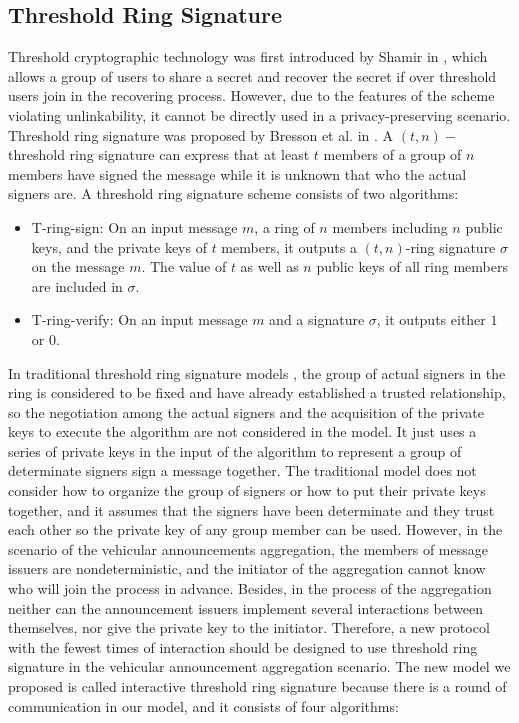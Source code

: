 \documentclass[a4paper]{article}
\begin{document}
\subsection{Threshold Ring Signature}
Threshold cryptographic technology was first introduced by Shamir in \cite{Sha79}, which allows a group of users to share a secret and recover the secret if over threshold users join in the recovering process. However, due to the features of the scheme violating unlinkability, it cannot be directly used in a privacy-preserving scenario. Threshold ring signature was proposed by Bresson et al. in \cite{BSS02}. A $(t,n)-$threshold ring signature can express that at least $t$ members of a group of $n$ members have signed the message while it is unknown that who the actual signers are. A threshold ring signature scheme consists of two algorithms:

\begin{itemize}
 \item T-ring-sign: On an input message $m$, a ring of $n$ members including $n$ public keys, and the private keys of $t$ members, it outputs a $(t,n)$-ring signature $\sigma$ on the message $m$. The value of $t$ as well as $n$ public keys of all ring members are included in $\sigma$.
 \item T-ring-verify: On an input message $m$ and a signature $\sigma$, it outputs either $1$ or $0$.
\end{itemize}

In traditional threshold ring signature models \cite{BSS02}\cite{RH13}, the group of actual signers in the ring is considered to be fixed and have already established a trusted relationship, so the negotiation among the actual signers and the acquisition of the private keys to execute the algorithm are not considered in the model. It just uses a series of private keys in the input of the algorithm to represent a group of determinate signers sign a message together. The traditional model does not consider how to organize the group of signers or how to put their private keys together, and it assumes that the signers have been determinate and they trust each other so the private key of any group member can be used. However, in the scenario of the vehicular announcements aggregation, the members of message issuers are nondeterministic, and the initiator of the aggregation cannot know who will join the process in advance. Besides, in the process of the aggregation neither can the announcement issuers implement several interactions between themselves, nor give the private key to the initiator. Therefore, a new protocol with the fewest times of interaction should be designed to use threshold ring signature in the vehicular announcement aggregation scenario. The new model we proposed is called interactive threshold ring signature because there is a round of communication in our model, and it consists of four algorithms:
\end{document}
